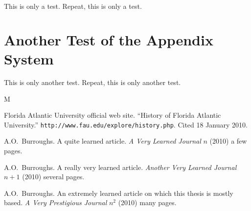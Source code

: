\documentclass[phd, 12pt, print]{fauthesis}
\begin{document}
This is only a test.  Repeat, this is only a test.


\chapter{Another Test of the Appendix System}

This is only another test.  Repeat, this is only another test.



\begin{thebibliography}{M}

	Florida Atlantic University official web site.
	``History of Florida Atlantic University.''
	\texttt{http://www.fau.edu/explore/history.php}.
	Cited 18 January 2010.

	A.O.~Burroughs.
	A quite learned article.
	\textit{A Very Learned Journal}	{\boldmath $n$} (2010) a few pages.

	A.O.~Burroughs.  
	A really very learned article.
	\textit{Another Very Learned Journal} {\boldmath $n+1$} (2010) several pages.

	A.O.~Burroughs.  
	An extremely learned article on which this thesis is mostly based.
	\textit{A Very Prestigious Journal} {\boldmath $n^2$} (2010) many pages.

\end{thebibliography}
\end{document}
